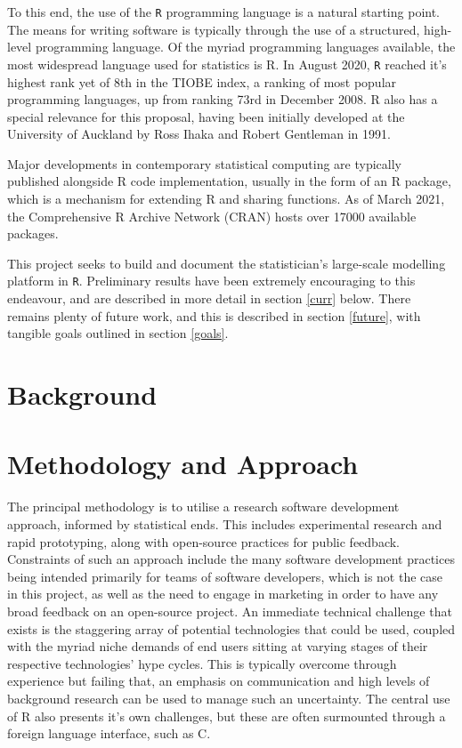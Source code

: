 \documentclass[a4paper,10pt]{article}
\begin{document}
To this end, the use of the \texttt{R} programming language is a natural starting point.
The means for writing software is typically through the use of a structured, high-level programming language.
Of the myriad programming languages available, the most widespread language used for statistics is R.
In August 2020, \texttt{R} reached it's highest rank yet of 8th in the TIOBE index, a ranking of most popular programming languages, up from ranking 73rd in December 2008\cite{tiobe2021r}.
R also has a special relevance for this proposal, having been initially developed at the University of Auckland by Ross Ihaka and Robert Gentleman in 1991\cite{ihaka1996r}.

Major developments in contemporary statistical computing are typically published alongside R code implementation, usually in the form of an R package, which is a mechanism for extending R and sharing functions.
As of March 2021, the Comprehensive R Archive Network (CRAN) hosts over 17000 available packages\cite{team20:_r}.

This project seeks to build and document the statistician's large-scale modelling platform in \texttt{R}.
Preliminary results have been extremely encouraging to this endeavour, and are described in more detail in section \ref{curr} below.
There remains plenty of future work, and this is described in section \ref{future}, with tangible goals outlined in section \ref{goals}.

\section{Background}\label{background}



\section{Methodology and Approach}

The principal methodology is to utilise a research software development approach, informed by statistical ends.
This includes experimental research and rapid prototyping, along with open-source practices for public feedback.
Constraints of such an approach include the many software development practices being intended primarily for teams of software developers, which is not the case in this project, as well as the need to engage in marketing in order to have any broad feedback on an open-source project.
An immediate technical challenge that exists is the staggering array of potential technologies that could be used, coupled with the myriad niche demands of end users sitting at varying stages of their respective technologies' hype cycles.
This is typically overcome through experience but failing that, an emphasis on communication and high levels of background research can be used to manage such an uncertainty.
The central use of R also presents it's own challenges, but these are often surmounted through a foreign language interface, such as C.
\end{document}
